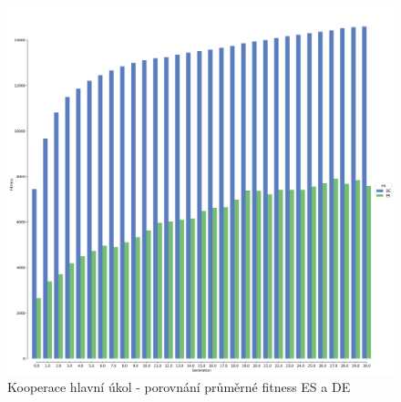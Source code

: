 	\begin{figure}[t]\centering
		\includegraphics[width=\columnwidth]{../img/WoodMap/DEvsES/WoodCoop.png}
		\caption{Kooperace  hlavní úkol  - porovnání průměrné fitness ES a DE}
		\label{obr04:CoopESvsDE}
	\end{figure}
